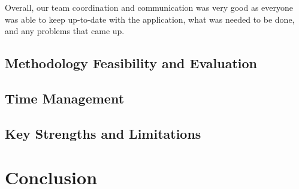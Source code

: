 \documentclass{article}
\begin{document}
    Overall, our team coordination and communication was very good as everyone was able to keep up-to-date with the application, what was needed to be done, and any problems that came up.

    \subsection{Methodology Feasibility and Evaluation}

    \subsection{Time Management}

    \subsection{Key Strengths and Limitations}


    \section{Conclusion}
\end{document}
